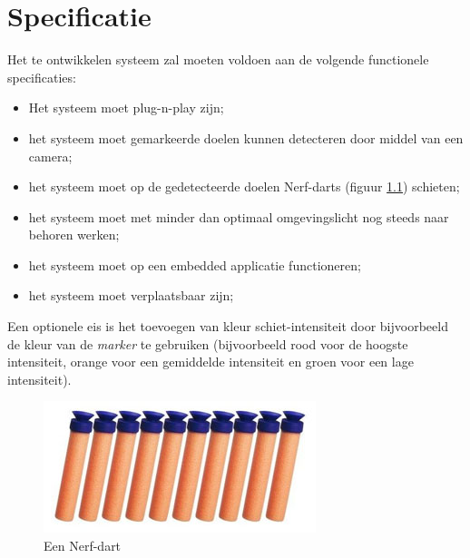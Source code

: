 \chapter{Specificatie}

Het te ontwikkelen systeem zal moeten voldoen aan de volgende functionele
specificaties:

\begin{itemize}
    \item Het systeem moet plug-n-play zijn;
    \item het systeem moet gemarkeerde doelen kunnen detecteren door middel van
        een camera;
    \item het systeem moet op de gedetecteerde doelen Nerf-darts (figuur
        \ref{fig:dart}) schieten;
    \item het systeem moet met minder dan optimaal omgevingslicht nog steeds
        naar behoren werken;
    \item het systeem moet op een embedded applicatie functioneren;
    \item het systeem moet verplaatsbaar zijn;
\end{itemize}

Een optionele eis is het toevoegen van kleur schiet-intensiteit door
bijvoorbeeld de kleur van de \emph{marker} te gebruiken (bijvoorbeeld rood
voor de hoogste intensiteit, orange voor een gemiddelde intensiteit en groen
voor een lage intensiteit).

\begin{figure}
    \begin{center}
        \includegraphics[scale=0.75]{figures/darts.jpg}
    \end{center}
    \caption{Een Nerf-dart}
    \label{fig:dart}
\end{figure}
